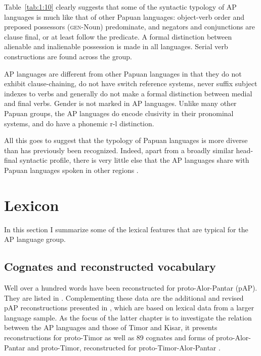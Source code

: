 Table~\ref{tab:1:10} clearly suggests that some of the syntactic typology of AP languages is much like that of other Papuan languages: object-verb order and preposed possessors (\textsc{gen}-Noun) predominate, and negators and conjunctions are clause final, or at least follow the predicate. A formal distinction between alienable and inalienable possession is made in all languages. Serial verb constructions are found across the group. 

AP languages are different from other Papuan languages in that they do not exhibit clause-chaining, do not have switch reference systems, never suffix subject indexes to verbs and generally do not make a formal distinction between medial and final verbs. Gender is not marked in AP languages. Unlike many other Papuan groups, the AP languages do encode clusivity in their pronominal systems, and do have a phonemic r-l distinction. 

All this goes to suggest that the typology of Papuan languages is more diverse than has previously been recognized. Indeed, apart from a broadly similar head-final syntactic profile, there is very little else that the AP languages share with Papuan languages spoken in other regions \citep[see also][]{HoltonRobinsonTVposition}.
 
 
\section{Lexicon}\label{sec:1:6}

In this section I summarize some of the lexical features that are typical for the AP language group. 

\subsection{Cognates and reconstructed vocabulary} \label{sec:1:6.1}
Well over a hundred words have been reconstructed for proto-Alor-Pantar (pAP). They are listed in \citet[Appendix]{HoltonRobinsonTVhistory}. Complementing these data are the additional and revised pAP reconstructions presented in \citet[Appendix A1]{SchapperEtAlTVtimor}, which are based on lexical data from a larger language sample. As the focus of the latter chapter is to investigate the relation between the AP languages and those of Timor and Kisar, it presents reconstructions for proto-Timor as well as 89 cognates and forms of proto-Alor-Pantar and proto-Timor, reconstructed for proto-Timor-Alor-Pantar \citep[Appendix~2 and~3]{SchapperEtAlTVtimor}.

